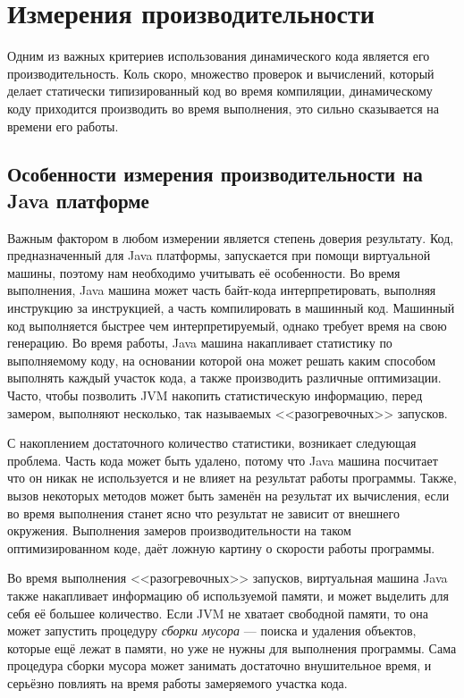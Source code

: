 \section{Измерения производительности}

Одним из важных критериев использования динамического кода является его производительность. Коль скоро, множество проверок и вычислений, который делает статически типизированный код во время компиляции, динамическому коду приходится производить во время выполнения, это сильно сказывается на времени его работы.

\subsection{Особенности измерения производительности на Java платформе}

Важным фактором в любом измерении является степень доверия результату. Код, предназначенный для Java платформы, запускается при помощи виртуальной машины, поэтому нам необходимо учитывать её особенности. Во время выполнения, Java машина может часть байт-кода интерпретировать, выполняя инструкцию за инструкцией, а часть  компилировать в машинный код. Машинный код выполняется быстрее чем интерпретируемый, однако требует время на свою генерацию. Во время работы, Java машина накапливает статистику по выполняемому коду, на основании которой она может решать каким способом выполнять каждый участок кода, а также производить различные оптимизации. Часто, чтобы позволить JVM накопить статистическую информацию, перед замером, выполняют несколько, так называемых <<разогревочных>> запусков.

С накоплением достаточного количество статистики, возникает следующая проблема. Часть кода может быть удалено, потому что Java машина посчитает что он никак не используется и не влияет на результат работы программы. Также, вызов некоторых методов может быть заменён на результат их вычисления, если во время выполнения станет ясно что результат не зависит от внешнего окружения. Выполнения замеров производительности на таком оптимизированном коде, даёт ложную картину о скорости работы программы.

Во время выполнения <<разогревочных>> запусков, виртуальная машина Java также накапливает информацию об используемой памяти, и может выделить для себя её большее количество. Если JVM не хватает свободной памяти, то она может запустить процедуру \textit{сборки мусора} --- поиска и удаления объектов, которые ещё лежат в памяти, но уже не нужны для выполнения программы. Сама процедура сборки мусора может занимать достаточно внушительное время, и серьёзно повлиять на время работы замеряемого участка кода.

